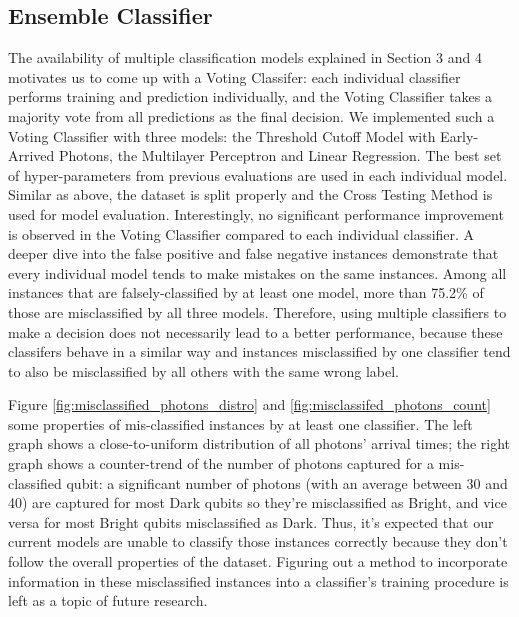 \documentclass[letterpaper,twocolumn,10pt]{article}
\begin{document}
\subsection{Ensemble Classifier}

The availability of multiple classification models explained in Section 3 and 4 motivates us to come up with a Voting Classifer: each individual classifier performs training and prediction individually, and the Voting Classifier takes a majority vote from all predictions as the final decision. We implemented such a Voting Classifier with three models: the Threshold Cutoff Model with Early-Arrived Photons, the Multilayer Perceptron and Linear Regression. The best set of hyper-parameters from previous evaluations are used in each individual model. Similar as above, the dataset is split properly and the Cross Testing Method is used for model evaluation. Interestingly, no significant performance improvement is observed in the Voting Classifier compared to each individual classifier. A deeper dive into the false positive and false negative instances demonstrate that every individual model tends to make mistakes on the same instances. Among all instances that are falsely-classified by at least one model, more than 75.2\% of those are misclassified by all three models. Therefore, using multiple classifiers to make a decision does not necessarily lead to a better performance, because these classifers behave in a similar way and instances misclassified by one classifier tend to also be misclassified by all others with the same wrong label.

Figure \ref{fig:misclassified_photons_distro} and \ref{fig:misclassifed_photons_count} some properties of mis-classified instances by at least one classifier. The left graph shows a close-to-uniform distribution of all photons' arrival times; the right graph shows a counter-trend of the number of photons captured for a mis-classified qubit: a significant number of photons (with an average between 30 and 40) are captured for most Dark qubits so they're misclassified as Bright, and vice versa for most Bright qubits misclassified as Dark. Thus, it's expected that our current models are unable to classify those instances correctly because they don't follow the overall properties of the dataset. Figuring out a method to incorporate information in these misclassified instances into a classifier's training procedure is left as a topic of future research.
\end{document}
